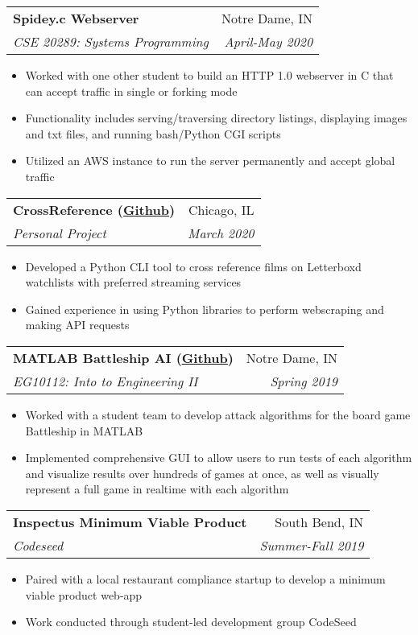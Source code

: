 \documentclass[letterpaper,10pt]{article}
\makeatletter
\newcommand{\resumeItem}[2]{
  \item\small{
    {#1}{#2 \vspace{-2pt}}
  }
}
\newcommand{\resumeSubheading}[4]{
  \vspace{-1pt}\item[]
  \begin{tabular*}{0.98\textwidth}{l@{\extracolsep{\fill}}r}
      \hspace{-10pt}\textbf{#1} & #2 \\
      \hspace{-10pt}\textit{\small#3} & \textit{\small #4} \\
    \end{tabular*}\vspace{-5pt}
}
\newcommand{\resumeItemListStart}{\begin{itemize}}
\newcommand{\resumeItemListEnd}{\end{itemize}\vspace{-5pt}}
\makeatother
\begin{document}
    \vspace{-3pt}

    \resumeSubheading
      {Spidey.c Webserver}{Notre Dame, IN}
      {CSE 20289: Systems Programming}{April-May 2020}
        \resumeItemListStart
        \resumeItem{}
          {Worked with one other student to build an HTTP 1.0 webserver in C that can accept traffic in single or forking mode}
        \resumeItem{}
          {Functionality includes serving/traversing directory listings, displaying images and txt files, and running bash/Python CGI scripts}
        \resumeItem{}
          {Utilized an AWS instance to run the server permanently and accept global traffic}
      \resumeItemListEnd
      
    \vspace{-3pt}
    \resumeSubheading
      {CrossReference (\href{https://github.com/cnrmrphy/crossReference}{\color{blue}\underline{Github}})}{Chicago, IL}
      {Personal Project}{March 2020}
        \resumeItemListStart
        \resumeItem{}
          {Developed a Python CLI tool to cross reference films on Letterboxd watchlists with preferred streaming services}
        \resumeItem{}
          {Gained experience in using Python libraries to perform webscraping and making API requests}
      \resumeItemListEnd
      
    \vspace{-3pt}
    \resumeSubheading
      {MATLAB Battleship AI (\href{https://github.com/cnrmrphy/Battleship-AI}{\color{blue}\underline{Github}})}{Notre Dame, IN}
      {EG10112: Into to Engineering II}{Spring 2019}
        \resumeItemListStart
        \resumeItem{}
          {Worked with a student team to develop attack algorithms for the board game Battleship in MATLAB}
        \resumeItem{}
          {Implemented comprehensive GUI to allow users to run tests of each algorithm and visualize results over hundreds of games at once, as well as visually represent a full game in realtime with each algorithm}
      \resumeItemListEnd
      
    \vspace{-3pt}
      
    \resumeSubheading
      {Inspectus Minimum Viable Product}{South Bend, IN}
      {Codeseed}{Summer-Fall 2019}
        \resumeItemListStart
        \resumeItem{}
          {Paired with a local restaurant compliance startup to develop a minimum viable product web-app}
        \resumeItem{}
          {Work conducted through student-led development group CodeSeed}
      \resumeItemListEnd
      
\end{document}
